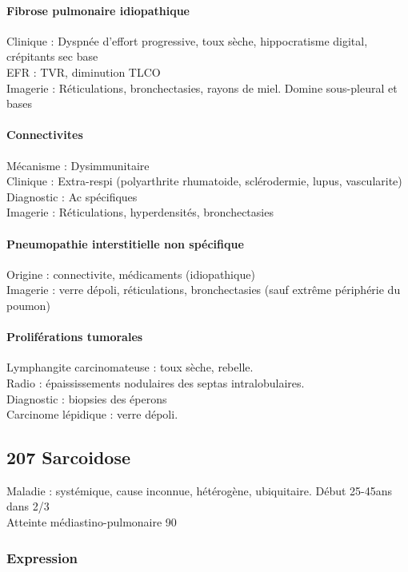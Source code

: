 \documentclass[11pt]{article}
\begin{document}
\paragraph{Fibrose pulmonaire idiopathique}
\label{sec:org64999c9}
Clinique : Dyspnée d'effort progressive, toux sèche, hippocratisme digital, crépitants sec base\\
EFR : TVR, diminution TLCO\\
Imagerie : Réticulations, bronchectasies, rayons de miel. Domine sous-pleural et bases

\paragraph{Connectivites}
\label{sec:org3080327}
Mécanisme : Dysimmunitaire\\
Clinique : Extra-respi (polyarthrite rhumatoide, sclérodermie, lupus, vascularite)\\
Diagnostic : Ac spécifiques\\
Imagerie : Réticulations, hyperdensités, bronchectasies

\paragraph{Pneumopathie interstitielle non spécifique}
\label{sec:orga57dfcc}
Origine : connectivite, médicaments (idiopathique)\\
Imagerie : verre dépoli, réticulations, bronchectasies (sauf extrême périphérie du poumon)

\paragraph{Proliférations tumorales}
\label{sec:orgbd964cf}
Lymphangite carcinomateuse : toux sèche, rebelle. \\
Radio : épaississements nodulaires des septas intralobulaires.\\
Diagnostic : biopsies des éperons\\
Carcinome lépidique : verre dépoli. 

\subsection{207 \textdagger{} Sarcoidose}
\label{sec:orga3b5d2d}
Maladie : systémique, cause inconnue, hétérogène, ubiquitaire. Début 25-45ans
dans 2/3\\
Atteinte médiastino-pulmonaire 90

\subsubsection{Expression}
\label{sec:orgd63c43b}
\label{sec:org39048da}
\end{document}
